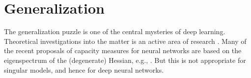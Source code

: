 \documentclass{article} %
\def\lto{\longrightarrow}
\begin{document}


\section{Generalization}\label{section:gen_error}
The generalization puzzle \citep{DBLP:journals/corr/abs-1801-00173} is one of the central mysteries of deep learning. Theoretical investigations into the matter is an active area of research \cite{neyshabur_exploring_2017}. Many of the recent proposals of capacity measures for neural networks are based on the eigenspectrum of the (degenerate) Hessian, e.g., \citet{thomas_information_2019, maddox_rethinking_2020}. But this is not appropriate for singular models, and hence for deep neural networks.
\end{document}
